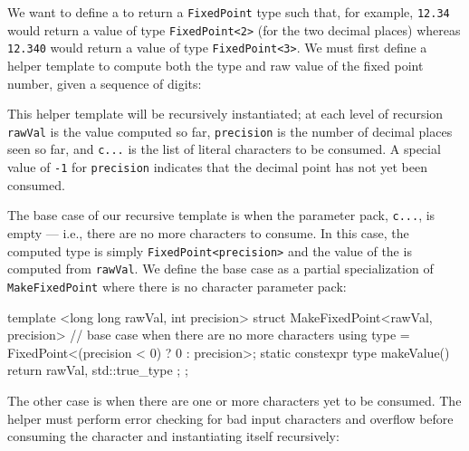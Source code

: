 We want to define a  to return a
\lstinline!FixedPoint! type such that, for example, \lstinline!12.34! would
return a value of type \lstinline!FixedPoint<2>! (for the two decimal
places) whereas \lstinline!12.340! would return a value of type
\lstinline!FixedPoint<3>!. We must first define a helper template to
compute both the type and raw value of the fixed point number, given a
sequence of digits:

\begin{emcppslisting}
namespace literals  // fixed-point literals defined in this namespace
{

template <long long rawVal, int precision, char... c>
struct MakeFixedPoint;
\end{emcppslisting}
    
\noindent This helper template will be recursively instantiated; at each level of
recursion \lstinline!rawVal! is the value computed so far,
\lstinline!precision! is the number of decimal places seen so far, and
\lstinline!c...! is the list of literal characters to be consumed. A
special value of \lstinline!-1! for \lstinline!precision! indicates that the decimal
point has not yet been consumed.

The base case of our recursive template is when the parameter pack,
\lstinline!c...!, is empty --- i.e., there are no more characters to
consume. In this case, the computed type is simply
\lstinline!FixedPoint<precision>! and the value of the  is computed from \lstinline!rawVal!. We define the base case as a
partial specialization of \lstinline!MakeFixedPoint! where there is no
character parameter pack:

\begin{emcppslisting}
template <long long rawVal, int precision>
struct MakeFixedPoint<rawVal, precision> {
    // base case when there are no more characters
    using type = FixedPoint<(precision < 0) ? 0 : precision>;
    static constexpr type makeValue() { return { rawVal, std::true_type{} }; }
};
\end{emcppslisting}
    
\noindent The other case is when there are one or more characters yet to be
consumed. The helper must perform error checking for bad input
characters and overflow before consuming the character and instantiating
itself recursively:

